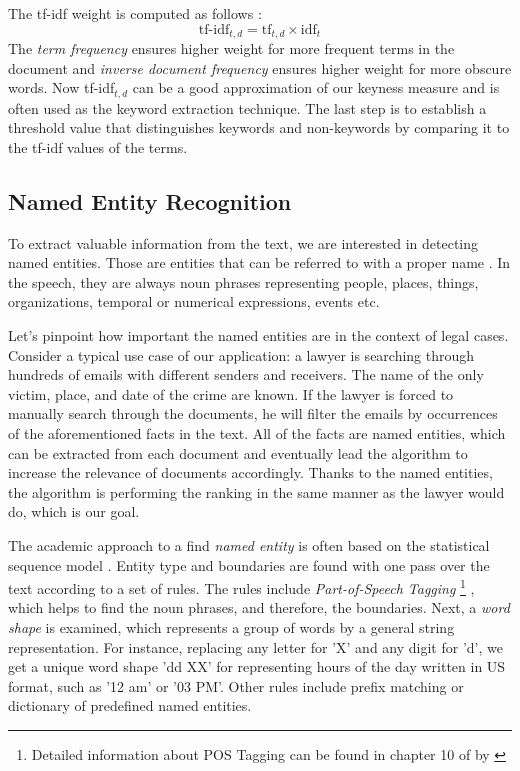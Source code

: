 \documentclass[
  digital, %
  table,   %
  lof,     %
  lot,     %
]{fithesis3}
\begin{document}
The tf-idf weight is computed as follows \cite[ch. 6]{manning2008introduction}:
$$
\text{tf-idf}_{t, d} = \text{tf}_{t,d} \times \text{idf}_t
$$
The \textit{term frequency} ensures higher weight for more frequent terms in the document and \textit{inverse document frequency} ensures higher weight for more obscure words. Now tf-idf$_{t, d}$ can be a good approximation of our keyness measure and is often used as the keyword extraction technique. The last step is to establish a threshold value that distinguishes keywords and non-keywords by comparing it to the tf-idf values of the terms.

\subsection{Named Entity Recognition}
To extract valuable information from the text, we are interested in detecting named entities.
Those are entities that can be referred to with a proper name \cite[ch. 21]{jurafsky2014speech}.
In the speech, they are always noun phrases representing people, places, things, organizations, temporal or numerical expressions, events etc.

Let's pinpoint how important the named entities are in the context of legal cases.
Consider a typical use case of our application: a lawyer is searching through hundreds of emails with different senders and receivers.
The name of the only victim, place, and date of the crime are known.
If the lawyer is forced to manually search through the documents, he will filter the emails by occurrences of the aforementioned facts in the text.
All of the facts are named entities, which can be extracted from each document and eventually lead the algorithm to increase the relevance of documents accordingly.
Thanks to the named entities, the algorithm is performing the ranking in the same manner as the lawyer would do, which is our goal.

The academic approach to a find \textit{named entity} is often based on the statistical sequence model \cite[ch. 21]{jurafsky2014speech}.
Entity type and boundaries are found with one pass over the text according to a set of rules.
The rules include \textit{Part-of-Speech Tagging} 
\footnote{Detailed information about POS Tagging can be found in chapter 10 of  by \citeauthor{jurafsky2014speech} \cite{jurafsky2014speech}}
, which helps to find the noun phrases, and therefore, the boundaries.
Next, a \textit{word shape} is examined, which represents a group of words by a general string representation. 
For instance, replacing any letter for 'X' and any digit for 'd', we get a unique word shape 'dd XX' for representing hours of the day written in US format, such as '12 am' or '03 PM'. 
Other rules include prefix matching or dictionary of predefined named entities.
\end{document}
